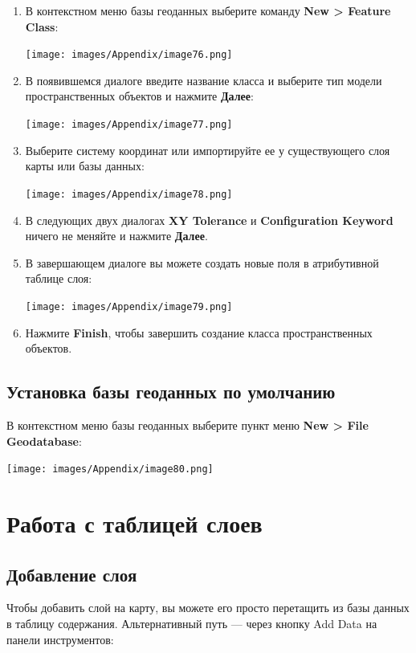 \documentclass[12pt,]{book}
\begin{document}
\begin{enumerate}
\def\labelenumi{\arabic{enumi}.}
\item
  В контекстном меню базы геоданных выберите команду \textbf{New \textgreater{} Feature Class}:

  \texttt{[image: images/Appendix/image76.png]}
\item
  В появившемся диалоге введите название класса и выберите тип модели пространственных объектов и нажмите \textbf{Далее}:

  \texttt{[image: images/Appendix/image77.png]}
\item
  Выберите систему координат или импортируйте ее у существующего слоя карты или базы данных:

  \texttt{[image: images/Appendix/image78.png]}
\item
  В следующих двух диалогах \textbf{XY Tolerance} и \textbf{Configuration Keyword} ничего не меняйте и нажмите \textbf{Далее}.
\item
  В завершающем диалоге вы можете создать новые поля в атрибутивной таблице слоя:

  \texttt{[image: images/Appendix/image79.png]}
\item
  Нажмите \textbf{Finish}, чтобы завершить создание класса пространственных объектов.
\end{enumerate}

\hypertarget{manual-gdb-default}{%
\section{Установка базы геоданных по умолчанию}\label{manual-gdb-default}}

В контекстном меню базы геоданных выберите пункт меню \textbf{New \textgreater{} File Geodatabase}:

\texttt{[image: images/Appendix/image80.png]}

\hypertarget{manual-toc}{%
\chapter{Работа с таблицей слоев}\label{manual-toc}}

\hypertarget{section-8}{%
\section{Добавление слоя}\label{section-8}}

Чтобы добавить слой на карту, вы можете его просто перетащить из базы данных в таблицу содержания. Альтернативный путь --- через кнопку Add Data на панели инструментов:
\end{document}
